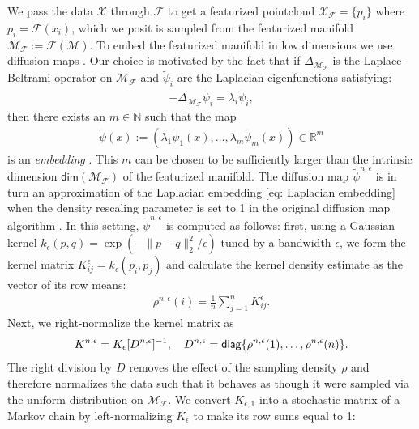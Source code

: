 \documentclass[reqno, 12pt]{article}
\begin{document}
We pass the data $\mathcal{X}$ through $\mathcal{F}$ to get a featurized pointcloud $\mathcal{X}_{\mathcal{F}} = \{p_i\}$ where $p_i = \mathcal{F}(x_i)$, which we posit is sampled from the featurized manifold $\mathcal{M}_{\mathcal{F}} := \mathcal{F}(\mathcal{M})$. To embed the featurized manifold in low dimensions we use diffusion maps \parencite{coifman2008diffusion}. Our choice is motivated by the fact that if $\Delta_{\mathcal{M}_{\mathcal{F}}}$ is the Laplace-Beltrami operator on $\mathcal{M}_{\mathcal{F}}$ and $\tilde{\psi}_i$ are the Laplacian eigenfunctions satisfying: 
\begin{align}
    -\Delta_{\mathcal{M_{\mathcal{F}}}}\tilde{\psi}_i = \lambda_i \tilde{\psi}_i,
\end{align}
then there exists an $m \in \mathbb{N}$ such that the map
\begin{align}
    \tilde{\psi}(x) :=  (\lambda_{1}\tilde{\psi}_1(x), \ldots, \lambda_{m}\tilde{\psi}_{m}(x)) \in \mathbb{R}^{m} \label{eq: Laplacian embedding}
\end{align}
is an \emph{embedding} \cite{BATES2014516}. This $m$ can be chosen to be sufficiently larger than the intrinsic dimension $\textsf{dim}(\mathcal{M}_\mathcal{F})$ of the featurized manifold. The diffusion map $\tilde{\psi}^{n,\epsilon}$ is in turn an approximation of the Laplacian embedding \eqref{eq: Laplacian embedding} when the density rescaling parameter is set to 1 in the original diffusion map algorithm \cite{coifman2008diffusion}. In this setting, $\tilde{\psi}^{n,\epsilon}$ is computed as follows: first, using a Gaussian kernel $k_{\epsilon}(p,q) = \exp(-\|p-q\|^{2}_{2}/\epsilon)$ tuned by a bandwidth $\epsilon$, we form the kernel matrix $K^{\epsilon}_{ij} = k_{\epsilon}(p_i,p_j)$ and calculate the kernel density estimate as the vector of its row means: 
 \begin{align}
     \rho^{n,\epsilon}(i) = \frac{1}{n}\sum_{j=1}^n K^{\epsilon}_{ij}.
 \end{align}
Next, we right-normalize the kernel matrix as
\begin{align}
K^{n,\epsilon} = K_{\epsilon}[D^{n,\epsilon}]^{-1},\quad D^{n,\epsilon} = {\sf diag}\{\rho^{n,\epsilon}(1),\ldots,\rho^{n,\epsilon}(n)\}.    
\end{align}
The right division by $D$ removes the effect of the sampling density $\rho$ and therefore normalizes the data such that it behaves as though it were sampled via the uniform distribution on $\mathcal{M}_{\mathcal{F}}$. We convert $K_{\epsilon,1}$ into a stochastic matrix of a Markov chain by left-normalizing $K_{\epsilon}$ to make its row sums equal to 1:
\end{document}
